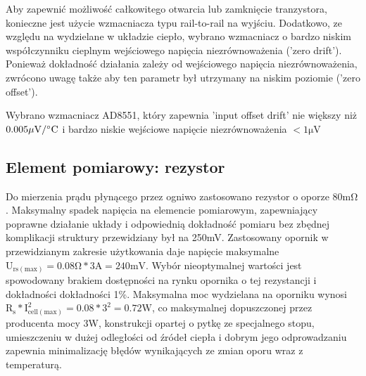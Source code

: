 \documentclass[polish,engineer]{polsl-msth}
\begin{document}
Aby zapewnić możliwość całkowitego otwarcia lub zamknięcie tranzystora, konieczne jest użycie wzmacniacza typu rail-to-rail na wyjściu. Dodatkowo, ze względu na wydzielane w układzie ciepło, wybrano wzmacniacz o bardzo niskim współczynniku cieplnym wejściowego napięcia niezrównoważenia ('zero drift'). Ponieważ dokładność działania zależy od wejściowego napięcia niezrównoważenia, zwrócono uwagę także aby ten parametr był utrzymany na niskim poziomie ('zero offset').

Wybrano wzmacniacz AD8551, który zapewnia 'input offset drift' nie większy niż $\mathrm{0.005 \mu V/\degree C}$ i bardzo niskie wejściowe napięcie niezrównoważenia $\mathrm{<1\mu V}$
\subsection{Element pomiarowy: rezystor}
Do mierzenia prądu płynącego przez ogniwo zastosowano rezystor o oporze $\mathrm{80m\Omega}$. Maksymalny spadek napięcia na elemencie pomiarowym, zapewniający poprawne działanie układy i odpowiednią dokładność pomiaru bez zbędnej komplikacji struktury przewidziany był na 250mV. Zastosowany opornik w przewidzianym zakresie użytkowania daje napięcie maksymalne $\mathrm{U_{rs(max)}=0.08\Omega * 3A = 240mV}$. Wybór nieoptymalnej wartości jest spowodowany brakiem dostępności na rynku opornika o tej rezystancji i dokładności dokładności 1\%. Maksymalna moc wydzielana na oporniku wynosi $\mathrm{R_s*I_{cell(max)}^2 = 0.08*3^2 = 0.72W}$, co maksymalnej dopuszczonej przez producenta mocy 3W, konstrukcji opartej o pytkę ze specjalnego stopu, umieszczeniu w dużej odległości od źródeł ciepła i dobrym jego odprowadzaniu zapewnia minimalizację błędów wynikających ze zmian oporu wraz z temperaturą.
\end{document}
